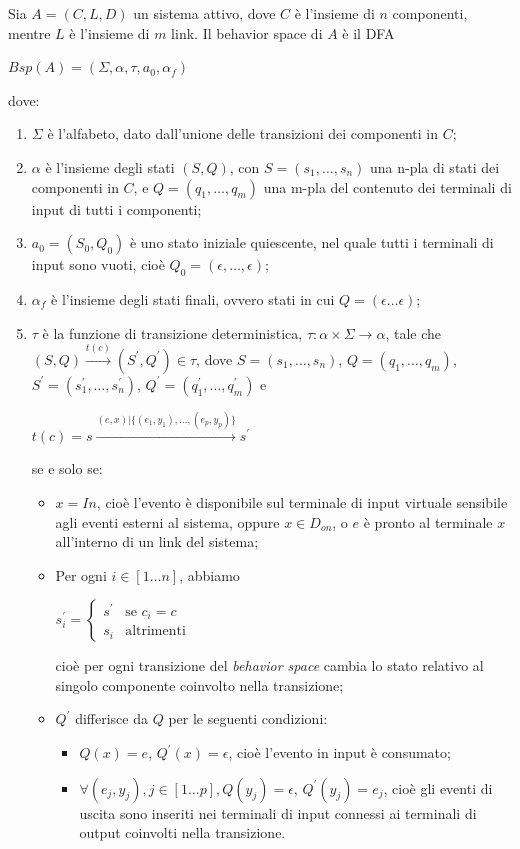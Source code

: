 \begin{defn}
Sia $A = (C,L,D)$ un sistema attivo, dove $C$ è l'insieme di $n$ componenti, mentre $L$ è l'insieme di $m$ link. Il behavior space di $A$ è il DFA
\begin{center}
	$Bsp(A) = (\Sigma,\alpha,\tau,a_0,\alpha_f)$
\end{center}
dove:
\begin{enumerate}
\item $\Sigma$ è l'alfabeto, dato dall'unione delle transizioni dei componenti in $C$;
\item $\alpha$  è l'insieme degli stati $(S,Q)$, con $S = (s_1,\ldots,s_n)$ una n-pla di stati dei componenti in $C$, e $Q = (q_1, \ldots,q_m)$ una m-pla del contenuto dei terminali di input di tutti i componenti;
\item $a_0 = (S_0,Q_0)$ è uno stato iniziale quiescente, nel quale tutti i terminali di input sono vuoti, cioè $Q_0 = (\epsilon, \ldots, \epsilon)$;
\item $\alpha_f$ è l'insieme degli stati finali, ovvero stati in cui $Q = (\epsilon \ldots \epsilon)$;
\item $\tau$ è la funzione di transizione deterministica, $\tau: \alpha \times \Sigma \rightarrow \alpha$, tale che $(S,Q) \xrightarrow{t(c)} (S^\prime, Q^\prime) \in \tau$, dove $S = (s_1, \ldots,s_n)$, $Q = (q_1, \ldots,q_m)$, $S^\prime = (s^\prime_1, \ldots,s^\prime_n)$, $Q^\prime = (q^\prime_1, \ldots,q^\prime_m)$ e
\begin{center}
$t(c) = s \xrightarrow{(e,x) | \{(e_1,y_1), \ldots, (e_p,y_p)\}} s^\prime$
\end{center}
se e solo se:
\begin{itemize}
\item $x = In$, cioè l'evento è disponibile sul terminale di input virtuale sensibile agli eventi esterni al sistema, oppure $x \in D_\mathit{on}$, o $e$ è pronto al terminale $x$ all'interno di un link del sistema;
\item Per ogni $i \in [1 \ldots n]$, abbiamo
\begin{center}
$s^\prime_i = \begin{cases} s^\prime & \mbox{se }c_i = c\\ s_i & \mbox{altrimenti} \end{cases}$
\end{center}
cioè per ogni transizione del \emph{behavior space} cambia lo stato relativo al singolo componente coinvolto nella transizione;
\item $Q^\prime$ differisce da $Q$ per le seguenti condizioni:
\begin{itemize}
\item $Q(x) = e$, $Q^\prime(x) = \epsilon$, cioè l'evento in input è consumato;
\item $\forall(e_j,y_j), j \in [1 \ldots p], Q(y_j) = \epsilon$, $Q^\prime(y_j) = e_j$, cioè gli eventi di uscita sono inseriti nei terminali di input connessi ai terminali di output coinvolti nella transizione. 
\end{itemize}
\end{itemize}
\end{enumerate}
\end{defn}
